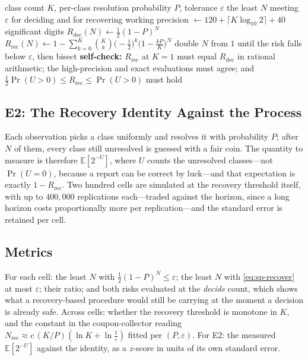 \begin{algorithm}[htbp]
\caption{The two thresholds, at a precision set from $K$}
\label{alg:sp-threshold}
\begin{algorithmic}[1]
\REQUIRE class count $K$, per-class resolution probability $P$, tolerance $\varepsilon$
\ENSURE the least $N$ meeting $\varepsilon$ for deciding and for recovering
\STATE working precision $\leftarrow 120+\lceil K\log_{10}2\rceil+40$ significant digits
\STATE $R_{\mathrm{dec}}(N)\leftarrow\tfrac12(1-P)^{N}$ 
\STATE $R_{\mathrm{rec}}(N)\leftarrow1-\sum_{k=0}^{K}\binom{K}{k}\bigl(-\tfrac12\bigr)^{k}
       \bigl(1-\tfrac{kP}{K}\bigr)^{N}$
  \STATE double $N$ from $1$ until the risk falls below $\varepsilon$, then bisect
\ENDFOR
\STATE \textbf{self-check:} $R_{\mathrm{rec}}$ at $K=1$ must equal $R_{\mathrm{dec}}$ in
       rational arithmetic; the high-precision and exact evaluations must agree; and
       $\tfrac12\Pr(U>0)\le R_{\mathrm{rec}}\le\Pr(U>0)$ must hold
\end{algorithmic}
\end{algorithm}

\subsection{E2: The Recovery Identity Against the Process}
\label{sec:sp-e2}

Each observation picks a class uniformly and resolves it with probability $P$; after $N$ of
them, every class still unresolved is guessed with a fair coin. The quantity to measure is
therefore $\mathbb{E}[2^{-U}]$, where $U$ counts the unresolved classes---not
$\Pr(U=0)$, because a report can be correct by luck---and that expectation is exactly
$1-R_{\mathrm{rec}}$. Two hundred cells are simulated at the recovery threshold itself, with up to
$400{,}000$ replications each---traded against the horizon, since a long horizon costs
proportionally more per replication---and the standard error is retained per cell.

\subsection{Metrics}

For each cell: the least $N$ with $\tfrac12(1-P)^{N}\le\varepsilon$; the least $N$ with
\eqref{eq:sp-recover} at most $\varepsilon$; their ratio; and both risks evaluated at the
\emph{decide} count, which shows what a recovery-based procedure would still be carrying at
the moment a decision is already safe. Across cells: whether the recovery threshold is
monotone in $K$, and the constant in the coupon-collector reading
$N_{\mathrm{rec}}\approx c\,(K/P)(\ln K+\ln\tfrac1\varepsilon)$ fitted per $(P,\varepsilon)$.
For E2: the measured $\mathbb{E}[2^{-U}]$ against the identity, as a $z$-score in units of its
own standard error.

